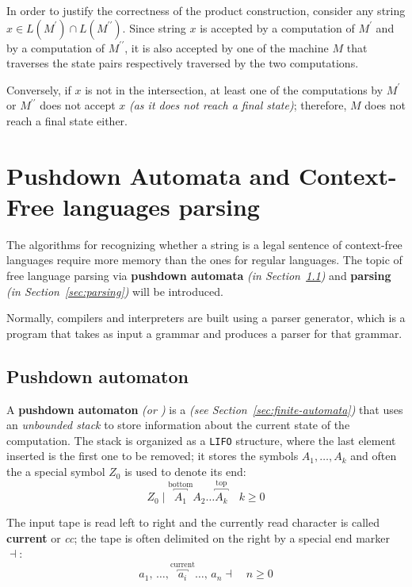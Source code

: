 \documentclass[english]{article}
\begin{document}
\bigskip
In order to justify the correctness of the product construction, consider any string \(x \in L(M^\prime) \cap L(M^{\prime\prime})\).
Since string \(x\) is accepted by a computation of \(M^\prime\) and by a computation of \(M^{\prime\prime}\), it is also accepted by one of the machine \(M\) that traverses the state pairs respectively traversed by the two computations.

Conversely, if \(x\) is not in the intersection, at least one of the computations by \(M^\prime\) or \(M^{\prime\prime}\) does not accept \(x\) \textit{(as it does not reach a final state)};
therefore, \(M\) does not reach a final state either.

\clearpage

\section{Pushdown Automata and Context-Free languages parsing}

The algorithms for recognizing whether a string is a legal sentence of context-free languages require more memory than the ones for regular languages.
The topic of free language parsing via \textbf{pushdown automata} \textit{(in Section~\ref{sec:pushdown-automaton})} and \textbf{parsing} \textit{(in Section~\ref{sec:parsing})} will be introduced.

Normally, compilers and interpreters are built using a parser generator, which is a program that takes as input a grammar and produces a parser for that grammar.

\subsection{Pushdown automaton}
\label{sec:pushdown-automaton}

A \textbf{pushdown automaton} \textit{(or \PDA)} is a \FSA \textit{(see Section~\ref{sec:finite-automata})} that uses an \textit{unbounded stack} to store information about the current state of the computation.
The stack is organized as a \texttt{LIFO} structure, where the last element inserted is the first one to be removed;
it stores the symbols \(A_1, \ldots, A_k\) and often the a special symbol \(Z_0\) is used to denote its end:
\[ Z_0 \mid \overbracket{A_1}^\text{bottom} A_2 \ldots \overbracket{A_k}^\text{top} \quad k \geq 0\]

The input tape is read left to right and the currently read character is called \textbf{current} or \textit{cc};
the tape is often delimited on the right by a special end marker \(\dashv\):
\[ a_1, \, \ldots, \overbracket{a_i}^{\text{current}} \ldots, \, a_n \dashv \quad n \geq 0 \]
\end{document}
